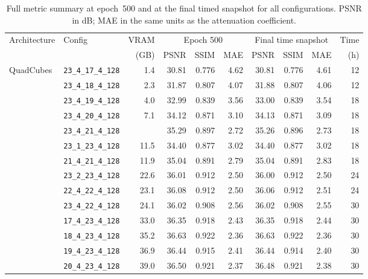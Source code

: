 \documentclass[12pt, a4paper, twoside]{report}
\begin{document}
\begin{table}[htbp]
\caption{Full metric summary at epoch~500 and at the final timed snapshot for all configurations. PSNR in dB; MAE in the same units as the attenuation coefficient.}
\label{tab:app_summary}
\begin{adjustwidth}{-3cm}{-1cm}
\centering
\footnotesize
\setlength{\tabcolsep}{3.5pt}
\begin{tabular}{llrrrrrrrr}
\toprule
Architecture & Config & VRAM & \multicolumn{3}{c}{Epoch 500} & \multicolumn{3}{c}{Final time snapshot} & Time \\
\cmidrule(lr){4-6}\cmidrule(lr){7-9}
 & & (GB) & PSNR & SSIM & MAE & PSNR & SSIM & MAE & (h) \\
\midrule
  QuadCubes & \texttt{23\_4\_17\_4\_128} &  1.4 & 30.81 & 0.776 & 4.62 & 30.81 & 0.776 & 4.61 & 12 \\
   & \texttt{23\_4\_18\_4\_128} &  2.3 & 31.87 & 0.807 & 4.07 & 31.88 & 0.807 & 4.06 & 12 \\
   & \texttt{23\_4\_19\_4\_128} &  4.0 & 32.99 & 0.839 & 3.56 & 33.00 & 0.839 & 3.54 & 18 \\
   & \texttt{23\_4\_20\_4\_128} &  7.1 & 34.12 & 0.871 & 3.10 & 34.13 & 0.871 & 3.09 & 18 \\
   & \texttt{23\_4\_21\_4\_128} &   & 35.29 & 0.897 & 2.72 & 35.26 & 0.896 & 2.73 & 18 \\
   & \texttt{23\_1\_23\_4\_128} & 11.5 & 34.40 & 0.877 & 3.02 & 34.40 & 0.877 & 3.02 & 18 \\
   & \texttt{21\_4\_21\_4\_128} & 11.9 & 35.04 & 0.891 & 2.79 & 35.04 & 0.891 & 2.83 & 18 \\
   & \texttt{23\_2\_23\_4\_128} & 22.6 & 36.01 & 0.912 & 2.50 & 36.00 & 0.912 & 2.50 & 24 \\
   & \texttt{22\_4\_22\_4\_128} & 23.1 & 36.08 & 0.912 & 2.50 & 36.06 & 0.912 & 2.51 & 24 \\
   & \texttt{23\_4\_22\_4\_128} & 24.1 & 36.02 & 0.908 & 2.56 & 36.02 & 0.908 & 2.55 & 30 \\
   & \texttt{17\_4\_23\_4\_128} & 33.0 & 36.35 & 0.918 & 2.43 & 36.35 & 0.918 & 2.44 & 30 \\
   & \texttt{18\_4\_23\_4\_128} & 35.2 & 36.63 & 0.922 & 2.36 & 36.63 & 0.922 & 2.36 & 30 \\
   & \texttt{19\_4\_23\_4\_128} & 36.9 & 36.44 & 0.915 & 2.41 & 36.44 & 0.914 & 2.40 & 30 \\
   & \texttt{20\_4\_23\_4\_128} & 39.0 & 36.50 & 0.921 & 2.37 & 36.48 & 0.921 & 2.38 & 30 \\

\end{tabular}
\end{adjustwidth}
\end{table}
\end{document}
